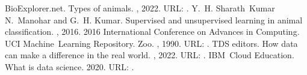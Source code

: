 \documentclass[letterpaper,10pt,english]{jupyterBook}
\begin{document}
\begin{sphinxthebibliography}{1}
\sphinxAtStartPar
BioExplorer.net. Types of animals. , 2022. URL: .
\sphinxAtStartPar
Y. H. Sharath Kumar N. Manohar and G. H. Kumar. Supervised and unsupervised learning in animal classification. , 2016. 2016 International Conference on Advances in Computing.
\sphinxAtStartPar
UCI Machine Learning Repository. Zoo. , 1990. URL: .
\sphinxAtStartPar
TDS editors. How data can make a difference in the real world. , 2022. URL: .
\sphinxAtStartPar
IBM Cloud Education. What is data science. 2020. URL: .
\end{sphinxthebibliography}







\renewcommand{\indexname}{Index}
\printindex
\end{document}

